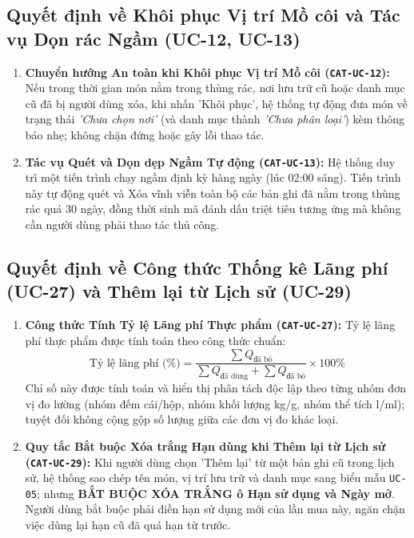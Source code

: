\documentclass[10pt,a4paper]{article}
\begin{document}
\subsection{Quyết định về Khôi phục Vị trí Mồ côi và Tác vụ Dọn rác Ngầm (UC-12, UC-13)}
\begin{enumerate}[itemsep=1pt]
    \item \textbf{Chuyển hướng An toàn khi Khôi phục Vị trí Mồ côi (\texttt{CAT-UC-12}):} Nếu trong thời gian món nằm trong thùng rác, nơi lưu trữ cũ hoặc danh mục cũ đã bị người dùng xóa, khi nhấn 'Khôi phục', hệ thống tự động đưa món về trạng thái \textit{'Chưa chọn nơi'} (và danh mục thành \textit{'Chưa phân loại'}) kèm thông báo nhẹ; không chặn đứng hoặc gây lỗi thao tác.
    \item \textbf{Tác vụ Quét và Dọn dẹp Ngầm Tự động (\texttt{CAT-UC-13}):} Hệ thống duy trì một tiến trình chạy ngầm định kỳ hàng ngày (lúc 02:00 sáng). Tiến trình này tự động quét và Xóa vĩnh viễn toàn bộ các bản ghi đã nằm trong thùng rác quá 30 ngày, đồng thời sinh mã đánh dấu triệt tiêu tương ứng mà không cần người dùng phải thao tác thủ công.
\end{enumerate}

\subsection{Quyết định về Công thức Thống kê Lãng phí (UC-27) và Thêm lại từ Lịch sử (UC-29)}
\begin{enumerate}[itemsep=1pt]
    \item \textbf{Công thức Tính Tỷ lệ Lãng phí Thực phẩm (\texttt{CAT-UC-27}):} Tỷ lệ lãng phí thực phẩm được tính toán theo công thức chuẩn:
    \[
    \text{Tỷ lệ lãng phí (\%)} = \frac{\sum Q_{\text{đã bỏ}}}{\sum Q_{\text{đã dùng}} + \sum Q_{\text{đã bỏ}}} \times 100\%
    \]
    Chỉ số này được tính toán và hiển thị phân tách độc lập theo từng nhóm đơn vị đo lường (nhóm đếm cái/hộp, nhóm khối lượng kg/g, nhóm thể tích l/ml); tuyệt đối không cộng gộp số lượng giữa các đơn vị đo khác loại.
    \item \textbf{Quy tắc Bắt buộc Xóa trắng Hạn dùng khi Thêm lại từ Lịch sử (\texttt{CAT-UC-29}):} Khi người dùng chọn 'Thêm lại' từ một bản ghi cũ trong lịch sử, hệ thống sao chép tên món, vị trí lưu trữ và danh mục sang biểu mẫu \texttt{UC-05}; nhưng \textbf{BẮT BUỘC XÓA TRẮNG ô Hạn sử dụng và Ngày mở}. Người dùng bắt buộc phải điền hạn sử dụng mới của lần mua này, ngăn chặn việc dùng lại hạn cũ đã quá hạn từ trước.
\end{enumerate}
\end{document}
